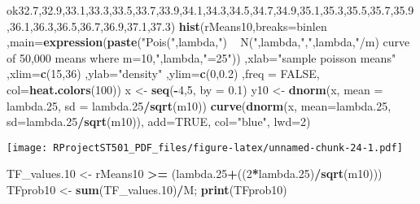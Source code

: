 \documentclass[
]{article}
\newenvironment{Shaded}{\begin{snugshade}}{\end{snugshade}}
\newcommand{\DataTypeTok}[1]{\textcolor[rgb]{0.13,0.29,0.53}{#1}}
\newcommand{\DecValTok}[1]{\textcolor[rgb]{0.00,0.00,0.81}{#1}}
\newcommand{\FloatTok}[1]{\textcolor[rgb]{0.00,0.00,0.81}{#1}}
\newcommand{\KeywordTok}[1]{\textcolor[rgb]{0.13,0.29,0.53}{\textbf{#1}}}
\newcommand{\NormalTok}[1]{#1}
\newcommand{\OperatorTok}[1]{\textcolor[rgb]{0.81,0.36,0.00}{\textbf{#1}}}
\newcommand{\OtherTok}[1]{\textcolor[rgb]{0.56,0.35,0.01}{#1}}
\newcommand{\StringTok}[1]{\textcolor[rgb]{0.31,0.60,0.02}{#1}}
\begin{document}
\begin{Shaded}
\begin{Highlighting}[]
ok{32.7}\NormalTok{,}\FloatTok{32.9}\NormalTok{,}\FloatTok{33.1}\NormalTok{,}\FloatTok{33.3}\NormalTok{,}\FloatTok{33.5}\NormalTok{,}\FloatTok{33.7}\NormalTok{,}\FloatTok{33.9}\NormalTok{,}\FloatTok{34.1}\NormalTok{,}\FloatTok{34.3}\NormalTok{,}\FloatTok{34.5}\NormalTok{,}\FloatTok{34.7}\NormalTok{,}\FloatTok{34.9}\NormalTok{,}\FloatTok{35.1}\NormalTok{,}\FloatTok{35.3}\NormalTok{,}\FloatTok{35.5}\NormalTok{,}\FloatTok{35.7}\NormalTok{,}\FloatTok{35.9}\NormalTok{,}\FloatTok{36.1}\NormalTok{,}\FloatTok{36.3}\NormalTok{,}\FloatTok{36.5}\NormalTok{,}\FloatTok{36.7}\NormalTok{,}\FloatTok{36.9}\NormalTok{,}\FloatTok{37.1}\NormalTok{,}\FloatTok{37.3}\NormalTok{)}
\KeywordTok{hist}\NormalTok{(rMeans10,}\DataTypeTok{breaks=}\NormalTok{binlen ,}\DataTypeTok{main=}\KeywordTok{expression}\NormalTok{(}\KeywordTok{paste}\NormalTok{(}\StringTok{"Pois("}\NormalTok{,lambda,}\StringTok{") ~ N("}\NormalTok{,lambda,}\StringTok{","}\NormalTok{,lambda,}\StringTok{"/m) curve of 50,000 means where m=10,"}\NormalTok{,lambda,}\StringTok{"=25"}\NormalTok{))  ,}\DataTypeTok{xlab=}\StringTok{"sample poisson means"}\NormalTok{ ,}\DataTypeTok{xlim=}\KeywordTok{c}\NormalTok{(}\DecValTok{15}\NormalTok{,}\DecValTok{36}\NormalTok{) ,}\DataTypeTok{ylab=}\StringTok{"density"}\NormalTok{ ,}\DataTypeTok{ylim=}\KeywordTok{c}\NormalTok{(}\DecValTok{0}\NormalTok{,}\FloatTok{0.2}\NormalTok{) ,}\DataTypeTok{freq =} \OtherTok{FALSE}\NormalTok{, }\DataTypeTok{col=}\KeywordTok{heat.colors}\NormalTok{(}\DecValTok{100}\NormalTok{))}
\NormalTok{x <-}\StringTok{ }\KeywordTok{seq}\NormalTok{(}\OperatorTok{-}\DecValTok{4}\NormalTok{,}\DecValTok{5}\NormalTok{, }\DataTypeTok{by =} \FloatTok{0.1}\NormalTok{)}
\NormalTok{y10 <-}\StringTok{ }\KeywordTok{dnorm}\NormalTok{(x, }\DataTypeTok{mean =}\NormalTok{ lambda}\FloatTok{.25}\NormalTok{, }\DataTypeTok{sd =}\NormalTok{ lambda}\FloatTok{.25}\OperatorTok{/}\KeywordTok{sqrt}\NormalTok{(m10))}
\KeywordTok{curve}\NormalTok{(}\KeywordTok{dnorm}\NormalTok{(x, }\DataTypeTok{mean=}\NormalTok{lambda}\FloatTok{.25}\NormalTok{, }\DataTypeTok{sd=}\NormalTok{lambda}\FloatTok{.25}\OperatorTok{/}\KeywordTok{sqrt}\NormalTok{(m10)), }\DataTypeTok{add=}\OtherTok{TRUE}\NormalTok{, }\DataTypeTok{col=}\StringTok{"blue"}\NormalTok{, }\DataTypeTok{lwd=}\DecValTok{2}\NormalTok{)}
\end{Highlighting}
\end{Shaded}

\texttt{[image: RProjectST501\_PDF\_files/figure-latex/unnamed-chunk-24-1.pdf]}

\begin{Shaded}
\begin{Highlighting}[]
\NormalTok{TF_values}\FloatTok{.10}\NormalTok{ <-}\StringTok{ }\NormalTok{rMeans10 }\OperatorTok{>=}\StringTok{ }\NormalTok{(lambda}\FloatTok{.25}\OperatorTok{+}\NormalTok{((}\DecValTok{2}\OperatorTok{*}\NormalTok{lambda}\FloatTok{.25}\NormalTok{)}\OperatorTok{/}\KeywordTok{sqrt}\NormalTok{(m10)))}
\NormalTok{TFprob10 <-}\StringTok{ }\KeywordTok{sum}\NormalTok{(TF_values}\FloatTok{.10}\NormalTok{)}\OperatorTok{/}\NormalTok{M; }\KeywordTok{print}\NormalTok{(TFprob10)}
\end{Highlighting}
\end{Shaded}
\end{document}
